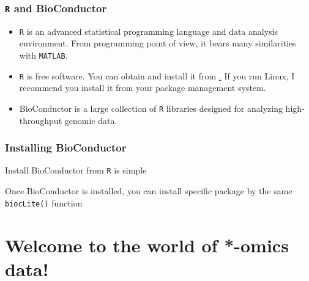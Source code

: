 \begin{frame}
  \frametitle{\texttt{R} and BioConductor}
  \begin{itemize}
  \item \texttt{R} is an advanced statistical programming language and
    data analysis environment. From programming point of view, it
    bears many similarities with \texttt{MATLAB}. 
  \item \texttt{R} is free software.  You can obtain and install it
    from \href{http://www.r-project.org/}.  If you run Linux, I
    recommend you install it from your package management system.
  \item BioConductor is a large collection of \texttt{R} libraries
    designed for analyzing high-throughput genomic data.  
  \end{itemize}
\end{frame}

\begin{frame}[fragile]
  \frametitle{Installing BioConductor}
  Install BioConductor from \texttt{R} is simple
\begin{knitrout}\footnotesize
{}\color{fgcolor}\begin{kframe}
\begin{alltt}
\end{alltt}
\end{kframe}
\end{knitrout}

Once BioConductor is installed, you can install specific package by the same \texttt{biocLite()} function

\begin{knitrout}\footnotesize
{}\color{fgcolor}\begin{kframe}
\begin{alltt}
\end{alltt}
\end{kframe}
\end{knitrout}

\end{frame}


\section{Welcome to the world of *-omics data!}

